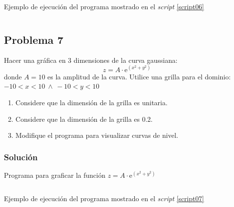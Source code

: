 \documentclass[a4paper,12pt,final]{article}
\begin{document}
      \begin{listing}[H]
        \caption{Ejemplo de ejecución del programa mostrado en el
        \emph{script} \ref{script06}}
        \label{script06sample}
        \inputminted{text}{./laboratorio_1/problema06_sample.txt}
      \end{listing}
      \vspace{\fill}

  \newpage
  \subsection*{Problema 7}
    \noindent Hacer una gráfica en 3 dimensiones de la curva gaussiana:
    $$z = A \cdot \mathrm{e}^{\left(x^2 + y^2\right)}$$
    donde $A=10$ es la amplitud de la curva. Utilice una grilla para el
    dominio: $-10 < x < 10\ \wedge\ -10 < y < 10$

    \begin{enumerate}
      \item Considere que la dimensión de la grilla es unitaria.
      \item Considere que la dimensión de la grilla es 0.2.
      \item Modifique el programa para visualizar curvas de nivel.
    \end{enumerate}

    \subsubsection*{Solución}
      \begin{listing}[H]
        \caption{Programa para graficar la función $z = A \cdot \mathrm{e}^{\left(x^2 + y^2\right)}$}
        \label{script07}
        \inputminted[firstline=5]{matlab}{./laboratorio_1/problema07.m}
      \end{listing}

      \begin{listing}[H]
        \caption{Ejemplo de ejecución del programa mostrado en el
        \emph{script} \ref{script07}}
        \label{script07sample}
        \inputminted{text}{./laboratorio_1/problema07_sample.txt}
      \end{listing}
\end{document}
